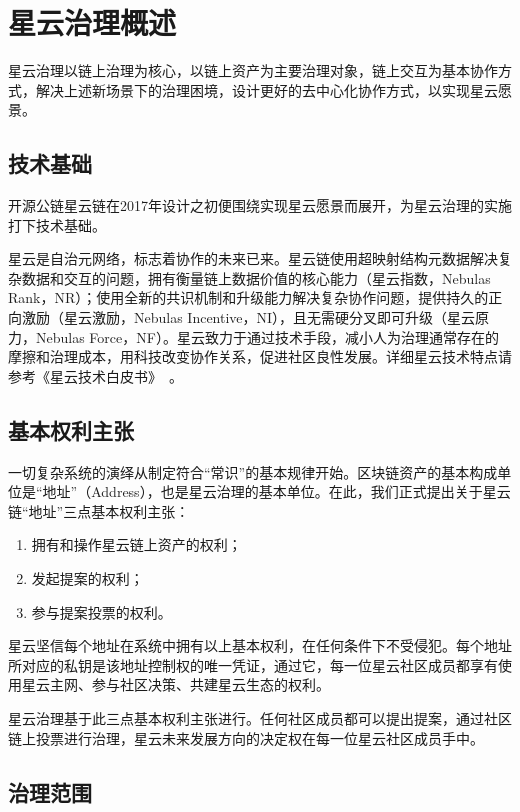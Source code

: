 \section{星云治理概述}

星云治理以链上治理为核心，以链上资产为主要治理对象，链上交互为基本协作方式，解决上述新场景下的治理困境，设计更好的去中心化协作方式，以实现星云愿景。

\subsection{技术基础}

开源公链星云链在2017年设计之初便围绕实现星云愿景而展开，为星云治理的实施打下技术基础。

星云是自治元网络，标志着协作的未来已来。星云链使用超映射结构元数据解决复杂数据和交互的问题，拥有衡量链上数据价值的核心能力（星云指数，Nebulas Rank，NR）；使用全新的共识机制和升级能力解决复杂协作问题，提供持久的正向激励（星云激励，Nebulas Incentive，NI），且无需硬分叉即可升级（星云原力，Nebulas Force，NF）。星云致力于通过技术手段，减小人为治理通常存在的摩擦和治理成本，用科技改变协作关系，促进社区良性发展。详细星云技术特点请参考《星云技术白皮书》~\cite{TechWhitepaper}。

\subsection{基本权利主张}
\label{rights}

一切复杂系统的演绎从制定符合“常识”的基本规律开始。区块链资产的基本构成单位是“地址”（Address），也是星云治理的基本单位。在此，我们正式提出关于星云链“地址”三点基本权利主张：

\begin{enumerate}
	\item 拥有和操作星云链上资产的权利；
	\item 发起提案的权利；
	\item 参与提案投票的权利。
\end{enumerate}

星云坚信每个地址在系统中拥有以上基本权利，在任何条件下不受侵犯。每个地址所对应的私钥是该地址控制权的唯一凭证，通过它，每一位星云社区成员都享有使用星云主网、参与社区决策、共建星云生态的权利。

星云治理基于此三点基本权利主张进行。任何社区成员都可以提出提案，通过社区链上投票进行治理，星云未来发展方向的决定权在每一位星云社区成员手中。

\subsection{治理范围}

